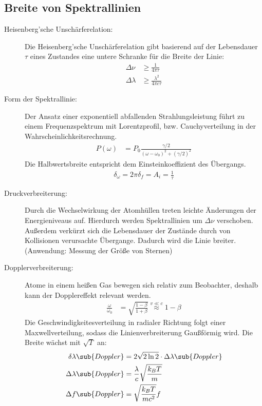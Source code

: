 \documentclass[twocolumn]{summery_4.1}
\begin{document}
\subsection{Breite von Spektrallinien}
\begin{description}
    \item[Heisenberg'sche Unschärferelation:]
    Die Heisenberg'sche Unschärferelation gibt basierend auf der Lebensdauer \(\tau\) eines Zustandes eine untere Schranke für die Breite der Linie:
    \begin{align*}
        \Delta \nu &\ge \frac{1}{4\pi \tau}\\
        \Delta \lambda &\ge \frac{\lambda^2}{4\pi c \tau }
    \end{align*} 
    \item[Form der Spektrallinie:]
    Der Ansatz einer exponentiell abfallenden Strahlungsleistung führt zu einem Frequenzspektrum mit Lorentzprofil, bzw. Cauchyverteilung in der Wahrscheinlichkeitsrechnung.
    \begin{align*}
        P(\omega) &= P_0 \frac{\gamma/2}{(\omega-\omega_0)^2 + (\gamma/2)^2} 
    \end{align*}
    Die Halbwertsbreite entspricht dem Einsteinkoeffizient des Übergangs.
    \begin{align*}
        \delta_\omega = 2\pi \delta_f = A_i = \frac1\tau
    \end{align*}
    \item[Druckverbreiterung:]
    Durch die Wechselwirkung der Atomhüllen treten leichte Änderungen der Energieniveaus auf. Hierdurch werden Spektrallinien um $\Delta \nu$ verschoben. Außerdem verkürzt sich die Lebensdauer der Zustände durch von Kollisionen verursachte Übergange. Dadurch wird die Linie breiter. (Anwendung: Messung der Größe von Sternen)
    \item[Dopplerverbreiterung:]
    Atome in einem heißen Gas bewegen sich relativ zum Beobachter, deshalb kann der Dopplereffekt relevant werden.
    \begin{align*}
        \frac{\omega}{\omega_0} &= \sqrt{\frac{1-\beta}{1+\beta}}
        \overset{v\ll c}\approx 1-\beta 
    \end{align*}
    Die Geschwindigkeitesverteilung in radialer Richtung folgt einer Maxwellverteilung, sodass die Linienverbreiterung Gaußförmig wird.
    Die Breite wächst mit \(\sqrt T\) an:
    \begin{align*}
        \delta \lambda\sub{Doppler} 
    &= 2\sqrt{2\ln 2 }\cdot \Delta\lambda\sub{Doppler}\\
    \Delta \lambda\sub{Doppler}&= \frac{\lambda}{c} \sqrt{\frac{k_B T}{m}}\\
    \Delta f\sub{Doppler}&= \sqrt{\frac{k_B T}{mc^2}} f\\
    \end{align*}
\end{description}
\end{document}
